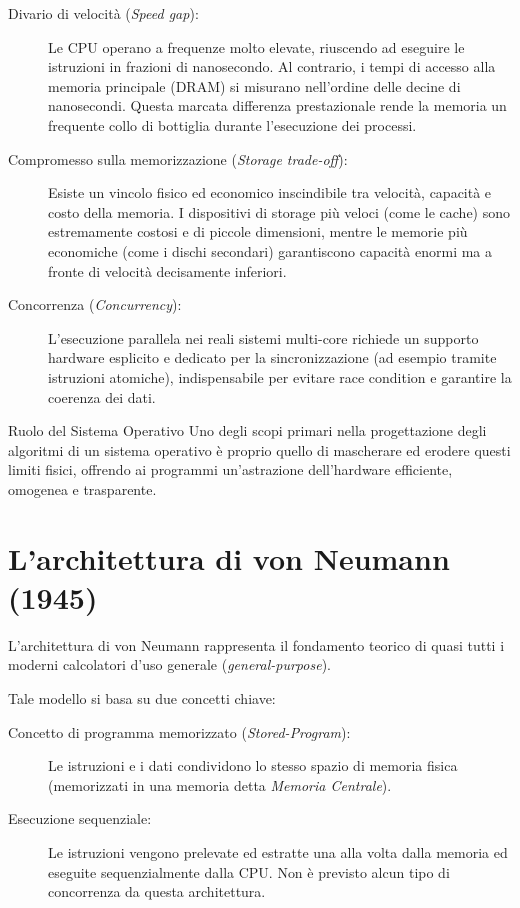 \documentclass[12pt]{report}
\begin{document}
	\begin{description}
		\item [Divario di velocità (\textit{Speed gap}):] Le CPU operano a frequenze molto elevate, riuscendo ad eseguire le istruzioni in frazioni di nanosecondo. Al contrario, i tempi di accesso alla memoria principale (DRAM) si misurano nell'ordine delle decine di nanosecondi. Questa marcata differenza prestazionale rende la memoria un frequente collo di bottiglia durante l'esecuzione dei processi.
		
		\item [Compromesso sulla memorizzazione (\textit{Storage trade-off}):] Esiste un vincolo fisico ed economico inscindibile tra velocità, capacità e costo della memoria. I dispositivi di storage più veloci (come le cache) sono estremamente costosi e di piccole dimensioni, mentre le memorie più economiche (come i dischi secondari) garantiscono capacità enormi ma a fronte di velocità decisamente inferiori.
		
		\item [Concorrenza (\textit{Concurrency}):] L'esecuzione parallela nei reali sistemi multi-core richiede un supporto hardware esplicito e dedicato per la sincronizzazione (ad esempio tramite istruzioni atomiche), indispensabile per evitare race condition e garantire la coerenza dei dati.
	\end{description}
	
	\begin{osservazione}{Ruolo del Sistema Operativo}{}
		Uno degli scopi primari nella progettazione degli algoritmi di un sistema operativo è proprio quello di mascherare ed erodere questi limiti fisici, offrendo ai programmi un'astrazione dell'hardware efficiente, omogenea e trasparente.
	\end{osservazione}
	
	\section{L'architettura di von Neumann (1945)}
	
	L'architettura di von Neumann rappresenta il fondamento teorico di quasi tutti i moderni calcolatori d'uso generale (\textit{general-purpose}).
	
	Tale modello si basa su due concetti chiave:
	\begin{description}
		\item [Concetto di programma memorizzato (\textit{Stored-Program}):] Le istruzioni e i dati condividono lo stesso spazio di memoria fisica (memorizzati in una memoria detta \textit{Memoria Centrale}).
		\item [Esecuzione sequenziale:] Le istruzioni vengono prelevate ed estratte una alla volta dalla memoria ed eseguite sequenzialmente dalla CPU. Non è previsto alcun tipo di concorrenza da questa architettura.
	\end{description}
	
\end{document}
